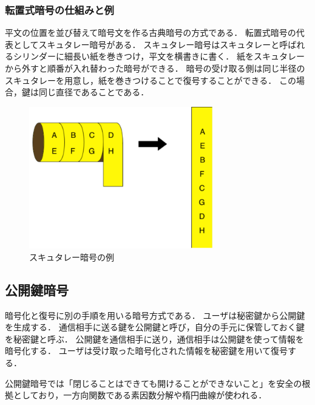 \documentclass[a4j,12pt]{jsarticle}
\begin{document}
\subsubsection{転置式暗号の仕組みと例}
平文の位置を並び替えて暗号文を作る古典暗号の方式である．
転置式暗号の代表としてスキュタレー暗号がある．
スキュタレー暗号はスキュタレーと呼ばれるシリンダーに細長い紙を巻きつけ，平文を横書きに書く．
紙をスキュタレーから外すと順番が入れ替わった暗号ができる．
暗号の受け取る側は同じ半径のスキュタレーを用意し，紙を巻きつけることで復号することができる．
この場合，鍵は同じ直径であることである．\\

\begin{figure}[H]
\centering
\includegraphics[width=8cm]{062.pdf}
\caption{スキュタレー暗号の例}
\label{fig:06}
\end{figure} 


\newpage
\subsection{公開鍵暗号}

暗号化と復号に別の手順を用いる暗号方式である．
ユーザは秘密鍵から公開鍵を生成する．
通信相手に送る鍵を公開鍵と呼び，自分の手元に保管しておく鍵を秘密鍵と呼ぶ．
公開鍵を通信相手に送り，通信相手は公開鍵を使って情報を暗号化する．
ユーザは受け取った暗号化された情報を秘密鍵を用いて復号する．

公開鍵暗号では「閉じることはできても開けることができないこと」を安全の根拠としており，一方向関数である素因数分解や楕円曲線が使われる．
\end{document}
